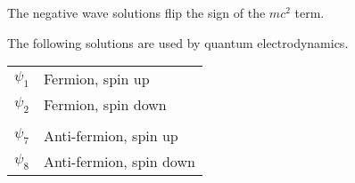 \documentclass[12pt]{article}
\begin{document}
\noindent
The negative wave solutions flip the sign of the $mc^2$ term.

\bigskip
\noindent
The following solutions are used by quantum electrodynamics.
\begin{center}
\begin{tabular}{ll}
$\psi_1$ & Fermion, spin up\\
$\psi_2$ & Fermion, spin down\\
\\
$\psi_7$ & Anti-fermion, spin up\\
$\psi_8$ & Anti-fermion, spin down
\end{tabular}
\end{center}
\end{document}
